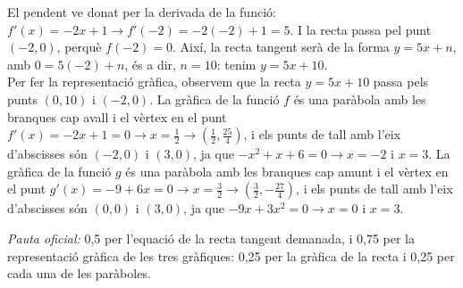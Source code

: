 \begin{apartats}
\begin{solucio}
El pendent ve donat per la derivada de la funció: $f'(x)=-2x+1\rightarrow f'(-2)=-2(-2)+1=5$. I la recta passa
pel punt $(-2,0)$, perquè $f(-2)=0$. Així, la recta tangent serà de la forma $y=5x+n$, amb $0=5(-2)+n$, és a
dir, $n=10$: tenim $y=5x+10$.\\
Per fer la representació gràfica, observem que la recta $y=5x+10$ passa pels punts $(0,10)$ i $(-2,0)$. La gràfica
de la funció $f$ és una paràbola amb les branques cap avall i el vèrtex en el punt
$f'(x)=-2x+1=0\rightarrow x=\frac12\rightarrow\left(\frac12,\frac{25}{4}\right)$, i els punts de tall amb l'eix
d'abscisses són $(-2,0)$ i $(3,0)$, ja que $-x^2+x+6=0\rightarrow x=-2$ i $x=3$. La gràfica de la funció $g$ és una
paràbola amb les branques cap amunt i el vèrtex en el punt
$g'(x)=-9+6x=0\rightarrow x=\frac32\rightarrow\left(\frac32,-\frac{27}{4}\right)$, i els punts de tall amb l'eix
d'abscisses són $(0,0)$ i $(3,0)$, ja que $-9x+3x^2=0\rightarrow x=0$ i $x=3$.
\begin{center}
\end{center}

\textit{Pauta oficial:} 0,5 per l'equació de la recta tangent demanada, i 0,75 per la representació gràfica de les
tres gràfiques: 0,25 per la gràfica de la recta i 0,25 per cada una de les paràboles.
\end{solucio}

\end{apartats}
